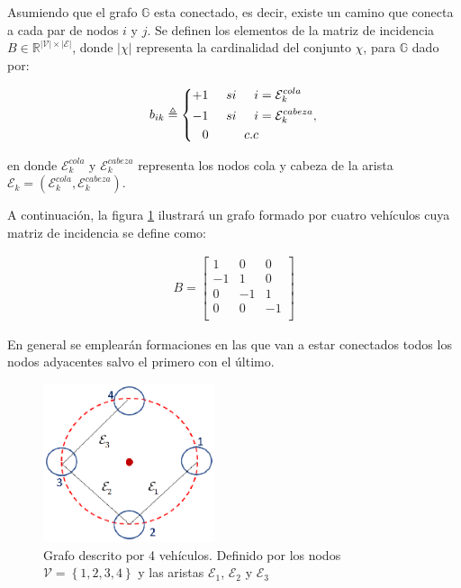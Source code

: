 Asumiendo que el grafo $\mathbb{G}$ esta conectado, es decir, existe un camino que conecta a cada par de nodos $i$ y $j$. Se definen los elementos de la matriz de incidencia $B\in\mathbb{R}^{|\mathcal{V}|\times|\mathcal{E}|}$, donde $|\chi|$ representa la cardinalidad del conjunto $\chi$, para $\mathbb{G}$ dado por:

\begin{equation} \label{Incidence}
  b_{ik}\triangleq\left \{
    \begin{aligned}
+1\hspace{5mm}si\hspace{5mm}i&=\mathcal{E}^{cola}_{k}\\
-1\hspace{5mm}si\hspace{5mm}i&=\mathcal{E}^{cabeza}_{k},\\
0\hspace{10mm}c.c\\
    \end{aligned}
  \right .
\end{equation}

en donde $\mathcal{E}^{cola}_{k}$ y $\mathcal{E}^{cabeza}_{k}$ representa los nodos cola y cabeza de la arista $\mathcal{E}_{k}=\left(\mathcal{E}^{cola}_{k},\mathcal{E}^{cabeza}_{k}\right)$. 

A continuación, la figura \ref{Grafo_Demostracion} ilustrará un grafo formado por cuatro vehículos cuya matriz de incidencia se define como:

\begin{equation} \label{Incidence_Matrix}
	\begin{aligned}
	{B}= 	
	\begin{bmatrix}
		 1 &  0  &  0\\
		-1 &  1  &  0\\
		 0 & -1  &  1\\
		 0 &  0 &  -1\\
	\end{bmatrix}
	\end{aligned}
\end{equation}

En general se emplearán formaciones en las que van a estar conectados todos los nodos adyacentes salvo el primero con el último.

\begin{figure}[H]
\centering
\includegraphics[width=0.45\textwidth]{figures/Grafo.eps}
\caption{Grafo descrito por 4 vehículos. Definido por los nodos $\mathcal{V}=\left\lbrace{1,2,3,4}\right\rbrace$ y las aristas $\mathcal{E}_1$, $\mathcal{E}_2$ y $\mathcal{E}_3$} \label{Grafo_Demostracion}
\end{figure}

